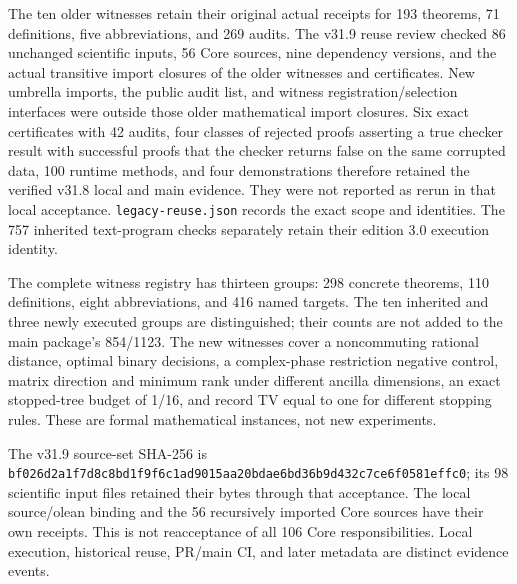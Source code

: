 \documentclass[
  11pt,
  oneside]{book}
\begin{document}
The ten older witnesses retain their original actual receipts for 193
theorems, 71 definitions, five abbreviations, and 269 audits. The v31.9
reuse review checked 86 unchanged scientific inputs, 56 Core sources,
nine dependency versions, and the actual transitive import closures of
the older witnesses and certificates. New umbrella imports, the public
audit list, and witness registration/selection interfaces were outside
those older mathematical import closures. Six exact certificates with 42
audits, four classes of rejected proofs asserting a true checker result
with successful proofs that the checker returns false on the same
corrupted data, 100 runtime methods, and four demonstrations therefore
retained the verified v31.8 local and main evidence. They were not
reported as rerun in that local acceptance. \texttt{legacy-\allowbreak reuse.\allowbreak json}
records the exact scope and identities. The 757 inherited text-program
checks separately retain their edition 3.0 execution identity.

The complete witness registry has thirteen groups: 298 concrete
theorems, 110 definitions, eight abbreviations, and 416 named targets.
The ten inherited and three newly executed groups are distinguished;
their counts are not added to the main package's 854/1123. The new
witnesses cover a noncommuting rational distance, optimal binary
decisions, a complex-phase restriction negative control, matrix
direction and minimum rank under different ancilla dimensions, an exact
stopped-tree budget of 1/16, and record TV equal to one for different
stopping rules. These are formal mathematical instances, not new
experiments.

The v31.9 source-set SHA-256 is
\texttt{bf026d2a1f7d\allowbreak 8c8bd1f9f6c1\allowbreak ad9015aa20bd\allowbreak ae6bd36b9d43\allowbreak 2c7ce6f0581e\allowbreak ffc0};
its 98 scientific input files retained their bytes through that
acceptance. The local source/olean binding and the 56 recursively
imported Core sources have their own receipts. This is not reacceptance
of all 106 Core responsibilities. Local execution, historical reuse,
PR/main CI, and later metadata are distinct evidence events.
\end{document}
